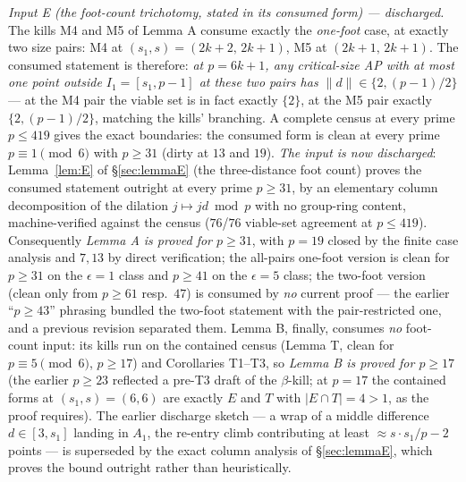 \documentclass[11pt,a4paper]{article}
\numberwithin{equation}{section}
\theoremstyle{plain}
\theoremstyle{definition}
\theoremstyle{remark}
\begin{document}
\emph{Input E (the foot-count trichotomy, stated in its consumed form) ---
discharged.}
The kills M4 and M5 of Lemma A consume exactly the \emph{one-foot} case, at
exactly two size pairs: M4 at $(s_1,s)=(2k{+}2,\,2k{+}1)$, M5 at
$(2k{+}1,\,2k{+}1)$. The consumed statement is therefore: \emph{at
$p=6k+1$, any critical-size AP with at most one point outside
$I_1=[s_1,p-1]$ at these two pairs has $\|d\|\in\{2,(p{-}1)/2\}$} --- at
the M4 pair the viable set is in fact exactly $\{2\}$, at the M5 pair
exactly $\{2,(p{-}1)/2\}$, matching the kills' branching. A complete
census at every prime $p\le419$ gives the exact boundaries: the consumed
form is clean at every prime $p\equiv1\pmod6$ with $p\ge31$ (dirty at $13$
and $19$). \emph{The input is now discharged}: Lemma~\ref{lem:E} of
\S\ref{sec:lemmaE} (the three-distance foot count) proves the consumed
statement outright at every prime $p\ge31$, by an elementary column
decomposition of the dilation $j\mapsto jd\bmod p$ with no group-ring
content, machine-verified against the census ($76$/$76$ viable-set
agreement at $p\le419$). Consequently \emph{Lemma A is proved for
$p\ge31$}, with $p=19$ closed by the finite case analysis and $7,13$ by
direct verification; the all-pairs one-foot version is clean for $p\ge31$
on the $\epsilon=1$ class and $p\ge41$ on the $\epsilon=5$ class; the two-foot
version (clean only from $p\ge61$ resp.\ $47$) is consumed by \emph{no}
current proof --- the earlier ``$p\ge43$'' phrasing bundled the two-foot
statement with the pair-restricted one, and a previous revision separated
them. Lemma B, finally, consumes \emph{no} foot-count input: its kills run
on the contained census (Lemma T, clean for $p\equiv5\pmod6$, $p\ge17$) and
Corollaries T1--T3, so \emph{Lemma B is proved for $p\ge17$} (the earlier
$p\ge23$ reflected a pre-T3 draft of the $\beta$-kill; at $p=17$ the
contained forms at $(s_1,s)=(6,6)$ are exactly $E$ and $T$ with
$|E\cap T|=4>1$, as the proof requires). The earlier discharge sketch ---
a wrap of a middle difference $d\in[3,s_1]$ landing in $A_1$, the
re-entry climb contributing at least $\approx s\cdot s_1/p-2$ points ---
is superseded by the exact column analysis of \S\ref{sec:lemmaE}, which
proves the bound outright rather than heuristically.
\end{document}
